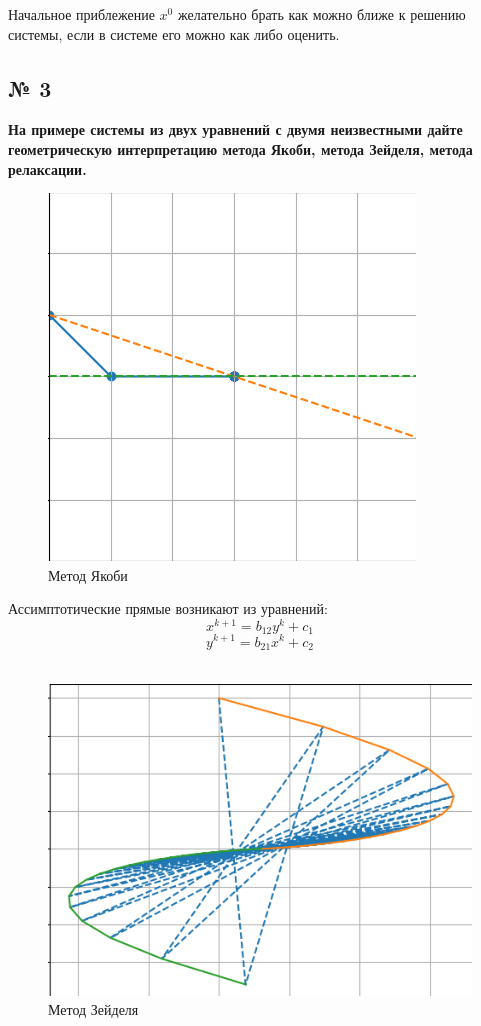 \documentclass[a4paper, 14pt]{article}
\begin{document}
Начальное приблежение $x^0$ желательно брать как можно ближе к решению системы, если в системе его можно как либо оценить.


\subsection*{№ 3}

\textbf{На примере системы из двух уравнений с двумя неизвестными дайте геометрическую интерпретацию метода Якоби, метода Зейделя, метода релаксации.\\}

\begin{figure}[h]
  \centering  
\includegraphics[scale=0.7]{1new.png} 
  \caption{Метод Якоби}
\end{figure}

Ассимптотические прямые возникают из уравнений:
\begin{equation*}
x^{k+1} = b_{12} y^k + c_1
\end{equation*}
\begin{equation*}
y^{k+1} = b_{21} x^k + c_2
\end{equation*}\\


\begin{figure}[h]
  \centering 
\includegraphics[scale=0.7]{2new.png} 
  \caption{Метод Зейделя}
\end{figure}
\end{document}
